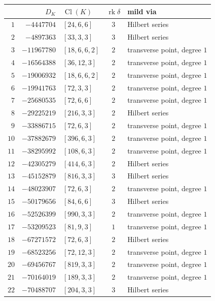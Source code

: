 \documentclass[11pt]{article}
\newcommand{\Cl}{\operatorname{Cl}}
\newcommand{\rk}{\operatorname{rk}}
\begin{document}
\begin{center}\small
\setlength{\tabcolsep}{5pt}%
\begin{longtable}{r r l c l}
\toprule
& $D_K$ & $\Cl(K)$ & $\rk\delta$ & mild via\\
\midrule
\endhead
\bottomrule
\endfoot

$1$ & $-4447704$ & $[24,6,6]$ & $3$ & Hilbert series\\
$2$ & $-4897363$ & $[33,3,3]$ & $3$ & Hilbert series\\
$3$ & $-11967780$ & $[18,6,6,2]$ & $2$ & transverse point, degree $1$\\
$4$ & $-16564388$ & $[36,12,3]$ & $2$ & transverse point, degree $1$\\
$5$ & $-19006932$ & $[18,6,6,2]$ & $2$ & transverse point, degree $1$\\
$6$ & $-19941763$ & $[72,3,3]$ & $2$ & transverse point, degree $1$\\
$7$ & $-25680535$ & $[72,6,6]$ & $2$ & transverse point, degree $1$\\
$8$ & $-29225219$ & $[216,3,3]$ & $2$ & Hilbert series\\
$9$ & $-33886715$ & $[72,6,3]$ & $2$ & transverse point, degree $1$\\
$10$ & $-37882679$ & $[396,6,3]$ & $2$ & transverse point, degree $1$\\
$11$ & $-38295992$ & $[108,6,3]$ & $2$ & transverse point, degree $1$\\
$12$ & $-42305279$ & $[414,6,3]$ & $2$ & Hilbert series\\
$13$ & $-45152879$ & $[816,3,3]$ & $3$ & Hilbert series\\
$14$ & $-48023907$ & $[72,6,3]$ & $2$ & transverse point, degree $1$\\
$15$ & $-50179656$ & $[84,6,6]$ & $3$ & Hilbert series\\
$16$ & $-52526399$ & $[990,3,3]$ & $2$ & transverse point, degree $1$\\
$17$ & $-53209523$ & $[81,9,3]$ & $1$ & transverse point, degree $1$\\
$18$ & $-67271572$ & $[72,6,3]$ & $2$ & Hilbert series\\
$19$ & $-68523256$ & $[72,12,3]$ & $2$ & transverse point, degree $1$\\
$20$ & $-69456767$ & $[819,3,3]$ & $2$ & transverse point, degree $1$\\
$21$ & $-70164019$ & $[189,3,3]$ & $2$ & transverse point, degree $1$\\
$22$ & $-70488707$ & $[204,3,3]$ & $3$ & Hilbert series\\

\end{longtable}
\end{center}
\end{document}
